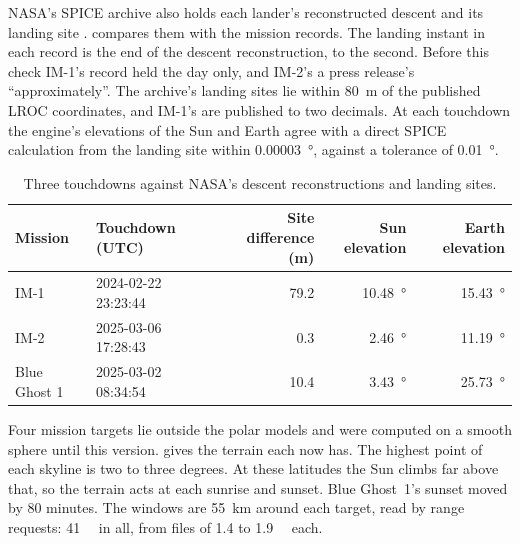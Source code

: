 \documentclass[11pt,a4paper]{article}
\begin{document}
NASA's SPICE archive also holds each lander's reconstructed descent and its landing site
\citep{naifclps}.  compares them with the mission records. The landing
instant in each record is the end of the descent reconstruction, to the second. Before this
check IM-1's record held the day only, and IM-2's a press release's ``approximately''. The
archive's landing sites lie within \qty{80}{\m} of the published LROC coordinates, and IM-1's
are published to two decimals. At each touchdown the engine's elevations of the Sun and Earth
agree with a direct SPICE calculation from the landing site within \qty{0.00003}{\degree},
against a tolerance of \qty{0.01}{\degree}.

\begin{table}[htbp]
\centering\small
\caption{Three touchdowns against NASA's descent reconstructions and landing sites.}
\label{tab:touchdown}
\begin{tabular}{@{}llrrr@{}}
\toprule
Mission & Touchdown (UTC) & Site difference (\unit{\m}) & Sun elevation & Earth elevation \\
\midrule
IM-1 & 2024-02-22 23:23:44 & 79.2 & \qty{10.48}{\degree} & \qty{15.43}{\degree} \\
IM-2 & 2025-03-06 17:28:43 & 0.3 & \qty{2.46}{\degree} & \qty{11.19}{\degree} \\
Blue Ghost 1 & 2025-03-02 08:34:54 & 10.4 & \qty{3.43}{\degree} & \qty{25.73}{\degree} \\
\bottomrule
\end{tabular}
\end{table}

Four mission targets lie outside the polar models and were computed on a smooth sphere until
this version.  gives the terrain each now has. The highest point of each
skyline is two to three degrees. At these latitudes the Sun climbs far above that, so the
terrain acts at each sunrise and sunset. Blue Ghost~1's sunset moved by 80 minutes. The windows are \qty{55}{\km} around each target, read by range
requests: \qty{41}{\mega\byte} in all, from files of 1.4 to \qty{1.9}{\giga\byte} each.
\end{document}
